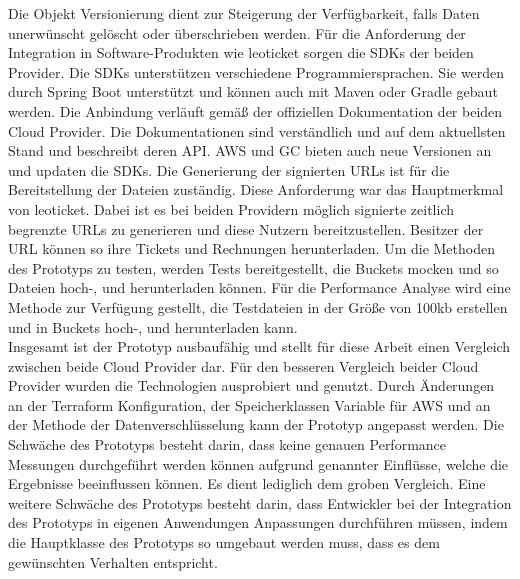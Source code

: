 Die Objekt Versionierung dient zur Steigerung der Verfügbarkeit, falls Daten unerwünscht gelöscht oder überschrieben werden. Für die Anforderung der Integration in Software-Produkten wie leoticket sorgen die SDKs der beiden Provider. Die SDKs unterstützen verschiedene Programmiersprachen. Sie werden durch Spring Boot unterstützt und können auch mit Maven oder Gradle gebaut werden. Die Anbindung verläuft gemäß der offiziellen Dokumentation der beiden Cloud Provider. Die Dokumentationen sind verständlich und auf dem aktuellsten Stand und beschreibt deren API. AWS und GC bieten auch neue Versionen an und updaten die SDKs. Die Generierung der signierten URLs ist für die Bereitstellung der Dateien zuständig. Diese Anforderung war das Hauptmerkmal von leoticket. Dabei ist es bei beiden Providern möglich signierte zeitlich begrenzte URLs zu generieren und diese Nutzern bereitzustellen. Besitzer der URL können so ihre Tickets und Rechnungen herunterladen. Um die Methoden des Prototyps zu testen, werden Tests bereitgestellt, die Buckets mocken und so Dateien hoch-, und herunterladen können. Für die Performance Analyse wird eine Methode zur Verfügung gestellt, die Testdateien in der Größe von 100kb erstellen und in Buckets hoch-, und herunterladen kann.\\

Insgesamt ist der Prototyp ausbaufähig und stellt für diese Arbeit einen Vergleich zwischen beide Cloud Provider dar. Für den besseren Vergleich beider Cloud Provider wurden die Technologien ausprobiert und genutzt. Durch Änderungen an der Terraform Konfiguration, der Speicherklassen Variable für AWS und an der Methode der Datenverschlüsselung kann der Prototyp angepasst werden. Die Schwäche des Prototyps besteht darin, dass keine genauen Performance Messungen durchgeführt werden können aufgrund genannter Einflüsse, welche die Ergebnisse beeinflussen können. Es dient lediglich dem groben Vergleich. Eine weitere Schwäche des Prototyps besteht darin, dass Entwickler bei der Integration des Prototyps in eigenen Anwendungen Anpassungen durchführen müssen, indem die Hauptklasse des Prototyps so umgebaut werden muss, dass es dem gewünschten Verhalten entspricht.